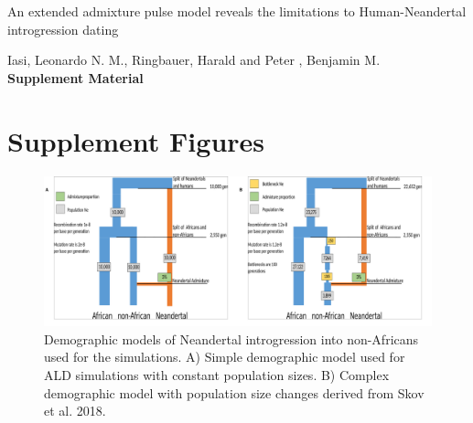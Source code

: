 \documentclass[11pt]{article}
\begin{document}
\begin{titlepage}


    \vspace*{1cm}
        
        
    \begin{center}       
        \large
        \vspace{1cm}
        An extended admixture pulse model reveals the limitations to Human-Neandertal introgression dating
        
       \vspace{1.0cm}
        \large
        Iasi, Leonardo N. M., Ringbauer, Harald  and Peter , Benjamin M. \\ 
        
        \vspace{1.0cm}
            \Huge
            \textbf{Supplement Material}
    \end{center} 

            

\end{titlepage}

\section{Supplement Figures}

\begin{figure}
\centering
\includegraphics{Admixture_Time_Inference_Paper_Draft_files/figure-latex/Simple_and_Skov.pdf}
\caption{\label{fig:figS1} Demographic models of Neandertal introgression into non-Africans used for the simulations. A) Simple demographic model used for ALD simulations with constant population sizes. B) Complex demographic model with population size changes derived from Skov et al. 2018.}
\end{figure}
\end{document}

